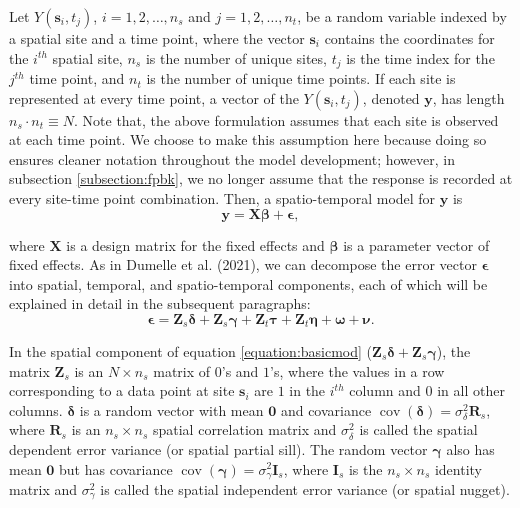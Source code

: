 \documentclass[smallextended]{svjour3}       %
\begin{document}
Let \(Y(\mathbf{s}_{i}, t_j)\), \(i = 1, 2, \ldots, n_{s}\) and
\(j = 1, 2, \ldots, n_{t}\), be a random variable indexed by a spatial
site and a time point, where the vector \(\mathbf{s}_i\) contains the
coordinates for the \(i^{th}\) spatial site, \(n_s\) is the number of
unique sites, \(t_j\) is the time index for the \(j^{th}\) time point,
and \(n_t\) is the number of unique time points. If each site is
represented at every time point, a vector of the
\(Y(\mathbf{s}_{i}, t_j)\), denoted \(\mathbf{y}\), has length
\(n_{s} \cdot n_{t} \equiv N\). Note that, the above formulation assumes
that each site is observed at each time point. We choose to make this
assumption here because doing so ensures cleaner notation throughout the
model development; however, in subsection \ref{subsection:fpbk}, we no
longer assume that the response is recorded at every site-time point
combination. Then, a spatio-temporal model for \(\mathbf{y}\) is \mbox{}
\begin{equation}
\mathbf{y} = \mathbf{X} \bm{\beta} + \bm{\epsilon},
\end{equation}

\noindent where \(\mathbf{X}\) is a design matrix for the fixed effects
and \(\bm{\beta}\) is a parameter vector of fixed effects. As in Dumelle
et al. (2021), we can decompose the error vector \(\bm{\epsilon}\) into
spatial, temporal, and spatio-temporal components, each of which will be
explained in detail in the subsequent paragraphs: \mbox{}
\begin{equation} \label{equation:basicmod}
\bm{\epsilon} = \mathbf{Z}_{s} \bm{\delta} + \mathbf{Z}_{s} \bm{\gamma} + \mathbf{Z}_t \bm{\tau} + \mathbf{Z}_t \bm{\eta} + \bm{\omega} + \bm{\nu}.
\end{equation}

In the spatial component of equation \ref{equation:basicmod}
(\(\mathbf{Z}_{s} \bm{\delta} + \mathbf{Z}_{s} \bm{\gamma}\)), the
matrix \(\mathbf{Z}_{s}\) is an \(N \times n_s\) matrix of \(0\)'s and
\(1\)'s, where the values in a row corresponding to a data point at site
\(\mathbf{s}_{i}\) are \(1\) in the \(i^{th}\) column and \(0\) in all
other columns. \(\bm{\delta}\) is a random vector with mean
\(\mathbf{0}\) and covariance
\(\mathop{\mathrm{{cov}}}(\bm{\delta}) = \sigma^2_{\delta} \mathbf{R}_{s}\),
where \(\mathbf{R}_s\) is an \(n_s \times n_s\) spatial correlation
matrix and \(\sigma^2_{\delta}\) is called the spatial dependent error
variance (or spatial partial sill). The random vector \(\bm{\gamma}\)
also has mean \(\mathbf{0}\) but has covariance
\(\mathop{\mathrm{{cov}}}(\bm{\gamma}) = \sigma^2_{\gamma} \mathbf{I}_{s}\),
where \(\mathbf{I}_s\) is the \(n_s \times n_s\) identity matrix and
\(\sigma^2_{\gamma}\) is called the spatial independent error variance
(or spatial nugget).
\end{document}

